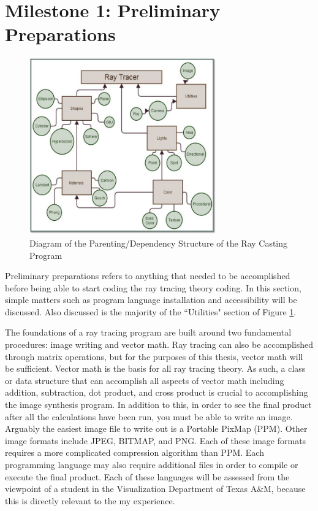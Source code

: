 \section{Milestone 1: Preliminary Preparations}
\label{Milestone1}
\begin{figure}[ht]
\centering
\includegraphics[height=3.0in]{figures/rayTracerStructure.jpg}
\caption{Diagram of the Parenting/Dependency Structure of the Ray Casting Program}
\label{fig:RayTracerDependencies}
\end{figure}
Preliminary preparations refers to anything that needed to be accomplished before being able to start coding the ray tracing theory coding.  In this section, simple matters such as program language installation and accessibility will be discussed.  Also discussed is the majority of the ``Utilities" section of Figure \ref{fig:RayTracerDependencies}.

The foundations of a ray tracing program are built around two fundamental procedures: image writing and vector math. Ray tracing can also be accomplished through matrix operations, but for the purposes of this thesis, vector math will be sufficient.  Vector math is the basis for all ray tracing theory. As such, a class or data structure that can accomplish all aspects of vector math including addition, subtraction, dot product, and cross product is crucial to accomplishing the image synthesis program.  In addition to this, in order to see the final product after all the calculations have been run, you must be able to write an image.  Arguably the easiest image file to write out is a Portable PixMap (PPM).  Other image formats include JPEG, BITMAP, and PNG.  Each of these image formats requires a more complicated compression algorithm than PPM.  Each programming language may also require additional files in order to compile or execute the final product.  Each of these languages will be assessed from the viewpoint of a student in the Visualization Department of Texas A\&M, because this is directly relevant to the my experience.

